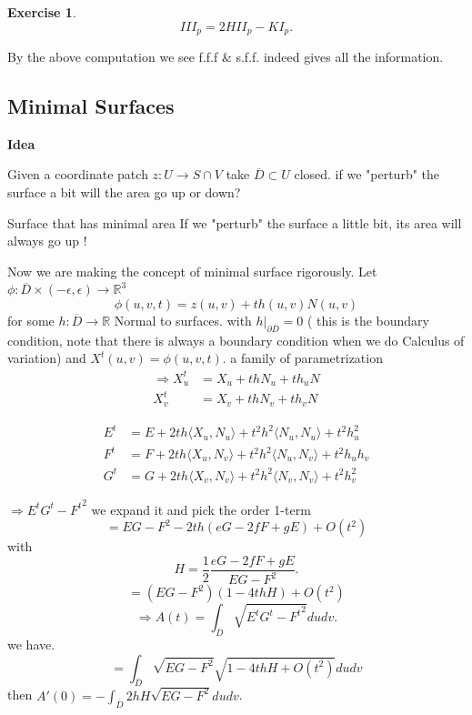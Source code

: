 \documentclass{article}
\newtheorem*{exercise}{Exercise}
\begin{document}
\begin{exercise}
\[ III_p = 2H II_p - K I_p. \]
\end{exercise}

\begin{remark}[Rank]
By the above computation we see f.f.f \& s.f.f.
indeed gives all the information.
\end{remark}

\subsection{Minimal Surfaces}

\textbf{Idea}

Given a coordinate patch $z: U \to S \cap V$
take $\overline{D} \subset U$ closed. if we "perturb" the surface
a bit will the area go up
or down?

\begin{definition}[Minimal surface "="]
Surface that has minimal area
If we "perturb" the surface a little bit, its area
will always go up !
\end{definition}

Now we are making the concept of minimal surface rigorously.
Let $\phi: \overline{D} \times (-\epsilon, \epsilon) \to \mathbb{R}^3$
\[ \phi(u,v,t) = z(u,v) + t h(u,v) N(u,v) \]
for some $h: \overline{D} \to \mathbb{R}$ Normal to surfaces.
with $h|_{\partial \overline{D}} = 0$ ( this is the boundary condition,
note that there is always a boundary condition
when we do Calculus of variation)
and $X^t(u,v) = \phi(u,v,t)$.
a family of parametrization
\begin{align*}
    \Rightarrow X^t_u &= X_u + th N_u + th_u N \\
    X^t_v &= X_v + th N_v + th_v N
\end{align*}

\begin{align*}
    E^t &= E + 2th\langle X_u, N_u \rangle + t^2 h^2 \langle N_u, N_u \rangle + t^2 h_u^2 \\
    F^t &= F + 2th\langle X_u, N_v \rangle + t^2 h^2 \langle N_u, N_v \rangle + t^2 h_u h_v \\
    G^t &= G + 2th\langle X_v, N_v \rangle + t^2 h^2 \langle N_v, N_v \rangle + t^2 h_v^2
\end{align*}

$\Rightarrow E^t G^t - {F^t}^2$ we expand it and pick the order 1-term
\[ = EG - F^2 - 2th(eG - 2fF + gE) + O(t^2) \]
with
\[ H = \frac{1}{2} \frac{eG - 2fF + gE}{EG - F^2}. \]
\[ = (EG - F^2)(1 - 4thH) + O(t^2) \]
\[ \Rightarrow A(t) = \int_{\overline{D}} \sqrt{E^t G^t - {F^t}^2} du dv. \]
we have.
\[ = \int_{\overline{D}} \sqrt{EG - F^2} \sqrt{1 - 4thH + O(t^2)} du dv \]
then $A'(0) = - \int_{\overline{D}} 2h H \sqrt{EG - F^2} du dv$.
\end{document}
